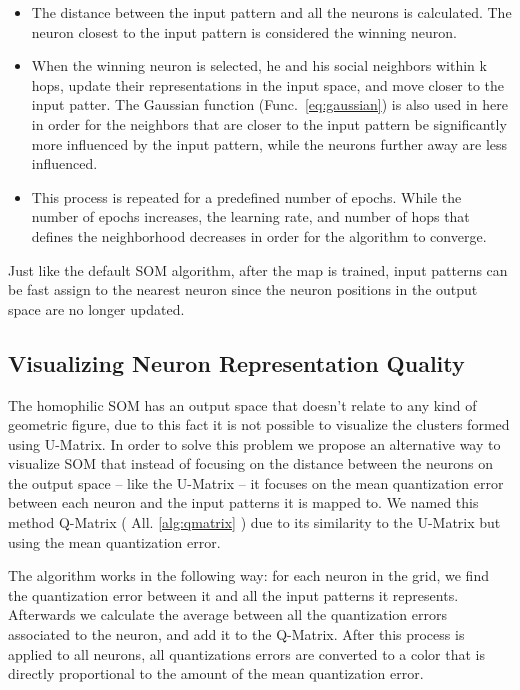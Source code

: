 \begin{itemize}
  \item The distance between the input pattern and all the neurons is calculated. The neuron closest to the input pattern is considered the winning neuron.
  \item When the winning neuron is selected, he and his social neighbors within k hops, update their representations in the input space, and move closer to the input patter. The Gaussian function (Func.~\ref{eq:gaussian}) is also used in here in order for the neighbors that are closer to the input pattern be significantly more influenced by the input pattern, while the neurons further away are less influenced. 
  \item This process is repeated for a predefined number of epochs. While the number of epochs increases, the learning rate, and number of hops that defines the neighborhood decreases in order for the algorithm to converge.
\end{itemize}

Just like the default \ac{SOM} algorithm, after the map is trained, input patterns can be fast assign to the nearest neuron since the neuron positions in the output space are no longer updated.

\subsection{Visualizing Neuron Representation Quality}
\label{sub:visualizing_neuron_representation_quality}
The homophilic \ac{SOM} has an output space that doesn't relate to any kind of geometric figure, due to this fact it is not possible to visualize the clusters formed using \ac{U-Matrix}. In order to solve this problem we propose an alternative way to visualize \ac{SOM} that instead of focusing on the distance between the neurons on the output space -- like the \ac{U-Matrix} -- it focuses on the mean quantization error between each neuron and the input patterns it is mapped to. We named this method Q-Matrix ( All. \ref{alg:qmatrix} ) due to its similarity to the \ac{U-Matrix} but using the mean quantization error.



The algorithm works in the following way: for each neuron in the grid, we find the quantization error between it and all the input patterns it represents. Afterwards we calculate the average between all the quantization errors associated to the neuron, and add it to the Q-Matrix. After this process is applied to all neurons, all quantizations errors are converted to a color that is directly proportional to the amount of the mean quantization error. 

